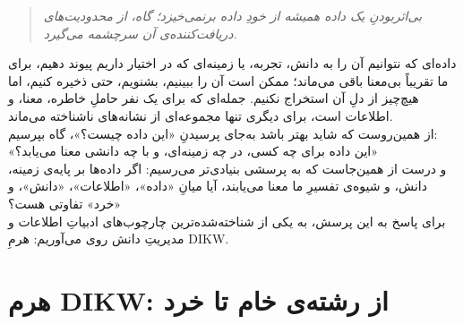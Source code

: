 \begin{quote}
\itshape
بی‌اثربودنِ یک داده همیشه از خودِ داده برنمی‌خیزد؛ گاه، از محدودیت‌های دریافت‌کننده‌ی آن سرچشمه می‌گیرد.
\end{quote}
داده‌ای که نتوانیم آن را به دانش، تجربه، یا زمینه‌ای که در اختیار داریم پیوند دهیم، برای ما تقریباً بی‌معنا باقی می‌ماند؛ ممکن است آن را ببینیم، بشنویم، حتی ذخیره کنیم، اما هیچ‌چیز از دلِ آن استخراج نکنیم. جمله‌ای که برای یک نفر حاملِ خاطره، معنا، و اطلاعات است، برای دیگری تنها مجموعه‌ای از نشانه‌های ناشناخته می‌ماند.\\
از همین‌روست که شاید بهتر باشد به‌جای پرسیدنِ «این داده چیست؟»، گاه بپرسیم:\\
«این داده برای چه کسی، در چه زمینه‌ای، و با چه دانشی معنا می‌یابد؟»\\
و درست از همین‌جاست که به پرسشی بنیادی‌تر می‌رسیم: اگر داده‌ها بر پایه‌ی زمینه، دانش، و شیوه‌ی تفسیرِ ما معنا می‌یابند، آیا میانِ «داده»، «اطلاعات»، «دانش»، و «خرد» تفاوتی هست؟\\
برای پاسخ به این پرسش، به یکی از شناخته‌شده‌ترین چارچوب‌های ادبیاتِ اطلاعات و مدیریتِ دانش روی می‌آوریم: هرمِ DIKW.
\newpage
\section{هرم DIKW: از رشته‌ی خام تا خرد}
\label{sec:levels-of-data}

